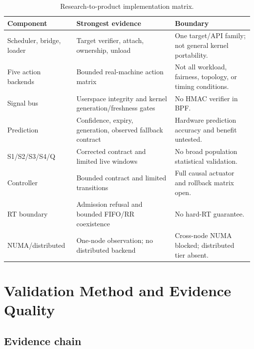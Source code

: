 \documentclass[11pt,a4paper,oneside]{report}
\begin{document}
\begin{table}[H]
\centering
\caption{Research-to-product implementation matrix.}
\begin{tabularx}{\textwidth}{@{}p{35mm}p{45mm}Y@{}}
\toprule
\textbf{Component} & \textbf{Strongest evidence} & \textbf{Boundary} \\
\midrule
Scheduler, bridge, loader & Target verifier, attach, ownership, unload & One
target/API family; not general kernel portability. \\
Five action backends & Bounded real-machine action matrix & Not all workload,
fairness, topology, or timing conditions. \\
Signal bus & Userspace integrity and kernel generation/freshness gates & No HMAC
verifier in BPF. \\
Prediction & Confidence, expiry, generation, observed fallback contract &
Hardware prediction accuracy and benefit untested. \\
S1/S2/S3/S4/Q & Corrected contract and limited live windows & No broad
population statistical validation. \\
Controller & Bounded contract and limited transitions & Full causal actuator
and rollback matrix open. \\
RT boundary & Admission refusal and bounded FIFO/RR coexistence & No hard-RT
guarantee. \\
NUMA/distributed & One-node observation; no distributed backend & Cross-node
NUMA blocked; distributed tier absent. \\
\bottomrule
\end{tabularx}
\end{table}

\chapter{Validation Method and Evidence Quality}

\section{Evidence chain}
\end{document}
